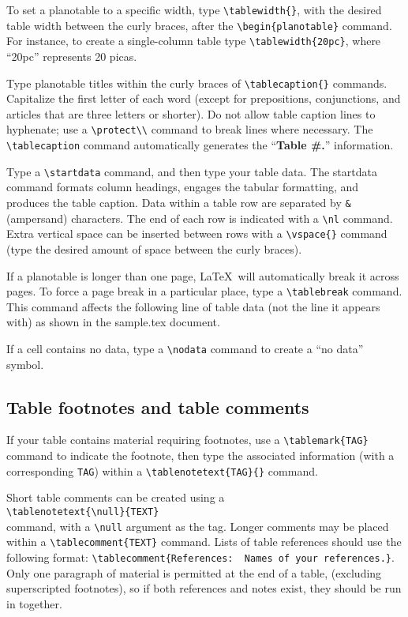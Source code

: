 \documentclass[extra,mreferee]{gji}
\begin{document}
To set a planotable to a specific width, type 
\verb"\tablewidth{}", with the desired table width between 
the curly braces, after the \verb"\begin{planotable}" 
command.  For instance, to create a single-column table 
type \verb"\tablewidth{20pc}", where ``20pc'' represents 20 picas.

Type planotable titles within the curly braces of
\verb"\tablecaption{}" commands.  Capitalize the first
letter of each word (except for prepositions, conjunctions,
and articles that are three letters or shorter).  Do not
allow table caption lines to hyphenate; use a
\verb"\protect\\" command to break lines where necessary.
The \verb"\tablecaption" command automatically generates
the ``{\bf Table \#.}'' information.  

Type a \verb"\startdata" command, and then type your table
data.  The startdata command formats column headings, 
engages the tabular formatting, and produces the table 
caption.  Data within a table row are separated by {\tt \&} 
(ampersand) characters.  The end of each row is indicated 
with a \verb"\nl" command.  Extra vertical space can be 
inserted between rows with a \verb"\vspace{}" command 
(type the desired amount of space between the curly
braces).

If a planotable is longer than one page, \LaTeX\ will 
automatically break it across pages.  To force a page 
break in a particular place, type a \verb"\tablebreak" 
command.  This command affects the following line of 
table data (not the line it appears with) as shown 
in the sample.tex document.

If a cell contains no data, type a \verb"\nodata" 
command to create a ``no data'' symbol.


\subsection{Table footnotes and table comments}

If your table contains material requiring footnotes, use a
\verb"\tablemark{TAG}" command to indicate the footnote,
then type the associated information (with a corresponding
{\tt TAG}) within a \verb"\tablenotetext{TAG}{}" command.

Short table comments can be created using a\\
\verb"\tablenotetext{\null}{TEXT}"\\
command, with a 
\verb"\null" argument as the tag.  Longer comments may
be placed within a \verb"\tablecomment{TEXT}" command.
Lists of table references should use the following
format: \verb"\tablecomment{References:  Names of your references.}".
Only one paragraph of material is permitted  at the end of a table,
(excluding superscripted footnotes), so if both references and notes
exist, they should be run in together.  
\end{document}
